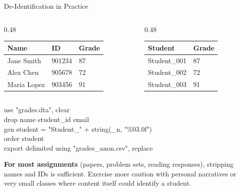 \documentclass[aspectratio=169, 10pt]{beamer}
\begin{document}
\begin{frame}{De-Identification in Practice}

\begin{columns}[T]
\begin{column}{0.48\textwidth}
\begin{tcolorbox}[keybox, title={\faTimesCircle\quad Before (contains PII)}]
\ttfamily\footnotesize
\begin{tabular}{lll}
Name & ID & Grade \\
\midrule
Jane Smith & 901234 & 87 \\
Alex Chen & 905678 & 72 \\
Maria Lopez & 903456 & 91 \\
\end{tabular}
\end{tcolorbox}
\end{column}

\begin{column}{0.48\textwidth}
\begin{tcolorbox}[keybox, title={\faCheckCircle\quad After (safe to share)}]
\ttfamily\footnotesize
\begin{tabular}{ll}
Student & Grade \\
\midrule
Student\_001 & 87 \\
Student\_002 & 72 \\
Student\_003 & 91 \\
\end{tabular}
\end{tcolorbox}
\end{column}
\end{columns}

\vspace{0.2cm}

\begin{tcolorbox}[keybox, title={\faCode\quad A simple Stata script handles this}]
\ttfamily\scriptsize
use "grades.dta", clear\\
drop name student\_id email\\
gen student = "Student\_" + string(\_n, "\%03.0f")\\
order student\\
export delimited using "grades\_anon.csv", replace
\end{tcolorbox}

\vspace{0.1cm}

\footnotesize\textbf{For most assignments} (papers, problem sets, reading responses), stripping names and IDs is sufficient. Exercise more caution with personal narratives or very small classes where content itself could identify a student.

\end{frame}
\end{document}
